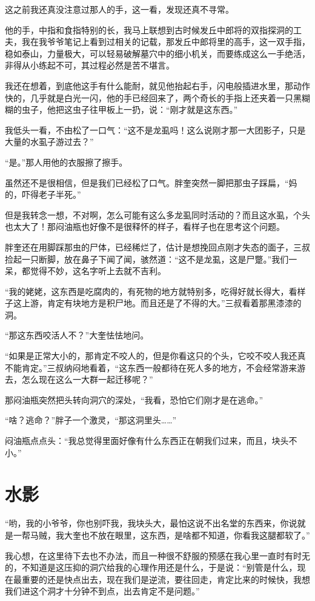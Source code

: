 这之前我还真没注意过那人的手，这一看，发现还真不寻常。

他的手，中指和食指特别的长，我马上联想到古时候发丘中郎将的双指探洞的工夫，我在我爷爷笔记上看到过相关的记载，那发丘中郎将里的高手，这一双手指，稳如泰山，力量极大，可以轻易破解墓穴中的细小机关，而要练成这么一手绝活，非得从小练起不可，其过程必然是苦不堪言。

我还在想着，到底他这手有什么能耐，就见他抬起右手，闪电般插进水里，那动作快的，几乎就是白光一闪，他的手已经回来了，两个奇长的手指上还夹着一只黑糊糊的虫子，他把这虫子往甲板上一扔，说：“刚才就是这东西。”

我低头一看，不由松了一口气：“这不是龙虱吗！这么说刚才那一大团影子，只是大量的水虱子游过去？”

“是。”那人用他的衣服擦了擦手。

虽然还不是很相信，但是我们已经松了口气。胖奎突然一脚把那虫子踩扁，“妈的，吓得老子半死。”

但是我转念一想，不对啊，怎么可能有这么多龙虱同时活动的？而且这水虱，个头也太大了！那闷油瓶也好像不是很释怀的样子，看样子也在思考这个问题。

胖奎还在用脚踩那虫的尸体，已经稀烂了，估计是想挽回点刚才失态的面子，三叔捡起一只断脚，放在鼻子下闻了闻，骇然道：“这不是龙虱，这是尸蹩。”我们一呆，都觉得不妙，这名字听上去就不吉利。

“我的姥姥，这东西是吃腐肉的，有死物的地方就特别多，吃得好就长得大，看样子这上游，肯定有块地方是积尸地。而且还是了不得的大。”三叔看着那黑漆漆的洞。

“那这东西咬活人不？”大奎怯怯地问。

“如果是正常大小的，那肯定不咬人的，但是你看这只的个头，它咬不咬人我还真不能肯定。”三叔纳闷地看着，“这东西一般都待在死人多的地方，不会经常游来游去，怎么现在这么一大群一起迁移呢？”

那闷油瓶突然把头转向洞穴的深处，“我看，恐怕它们刚才是在逃命。”

“啥？逃命？”胖子一个激灵，“那这洞里头……”

闷油瓶点点头：“我总觉得里面好像有什么东西正在朝我们过来，而且，块头不小。”

\chapter{水影}

“哟，我的小爷爷，你也别吓我，我块头大，最怕这说不出名堂的东西来，你说就是一帮马贼，我大奎也不放在眼里，这东西，是啥都不知道，你看我这腿都软了。”

我心想，在这里待下去也不办法，而且一种很不舒服的预感在我心里一直时有时无的，不知道是这压抑的洞穴给我的心理作用还是什么，于是说：“别管是什么，现在最重要的还是快点出去，现在我们是逆流，要往回走，肯定比来的时候快，我想我们进这个洞才十分钟不到点，出去肯定不是问题。”

